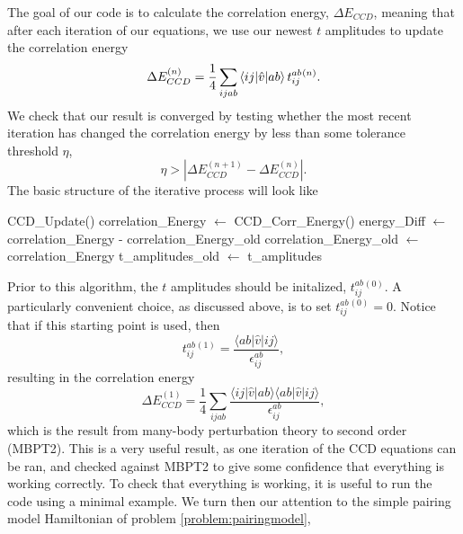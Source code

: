    The goal of our code is to calculate the correlation energy,
   $\Delta E_{CCD}$, meaning that after each iteration of our equations, we use
   our newest $t$ amplitudes to update the correlation energy
  \begin{equation}
  \Delta E_{CCD}^{(n)} = \frac{1}{4} \sum_{ijab}
  \braket{ij|\hat{v}|ab}t^{ab}_{ij}{}^{(n)}.
  \end{equation}
  We check that our result is converged by testing whether the
  most recent iteration has changed the correlation energy by less
  than some tolerance threshold $\eta$,
  \begin{equation}
  \eta > | \Delta E_{CCD}^{(n+1)} - \Delta E_{CCD}^{(n)} |.
  \end{equation}
  The basic structure of the iterative process will look like
\begin{svgraybox}
  \begin{algorithmic}
     \State CCD\_Update()
    \State correlation\_Energy $\gets$ CCD\_Corr\_Energy() \State
    energy\_Diff $\gets$ correlation\_Energy -
    correlation\_Energy\_old \State correlation\_Energy\_old $\gets$
    correlation\_Energy \State t\_amplitudes\_old $\gets$
    t\_amplitudes \EndWhile
  \end{algorithmic}
\end{svgraybox}
  Prior to this algorithm, the $t$ amplitudes should be initalized,
  $t_{ij}^{ab}{}^{(0)}$. A particularly convenient choice, as discussed above, is to set
  $t_{ij}^{ab}{}^{(0)} = 0$. Notice that if this starting point is
  used, then
  \begin{equation}
  t_{ij}^{ab}{}^{(1)} = \frac{\langle ab \vert \hat{v} \vert ij\rangle}{\epsilon^{ab}_{ij}},
  \label{eq:ccdGuess}
  \end{equation}
resulting in the correlation energy
  \begin{equation}
  \Delta E_{CCD}^{(1)} = \frac{1}{4} \sum_{ijab}\frac{\langle ij \vert \hat{v} \vert ab \rangle\langle ab \vert \hat{v} \vert ij \rangle}{\epsilon^{ab}_{ij}},
  \end{equation}
  which is the result from many-body perturbation theory to second order (MBPT2).  This is a very useful result, as one iteration
  of the CCD equations can be ran, and checked against MBPT2 to give
  some confidence that everything is working correctly. To check that
  everything is working, it is useful to run the code using a minimal
  example. We turn then our attention to the simple pairing model Hamiltonian of problem \ref{problem:pairingmodel},
